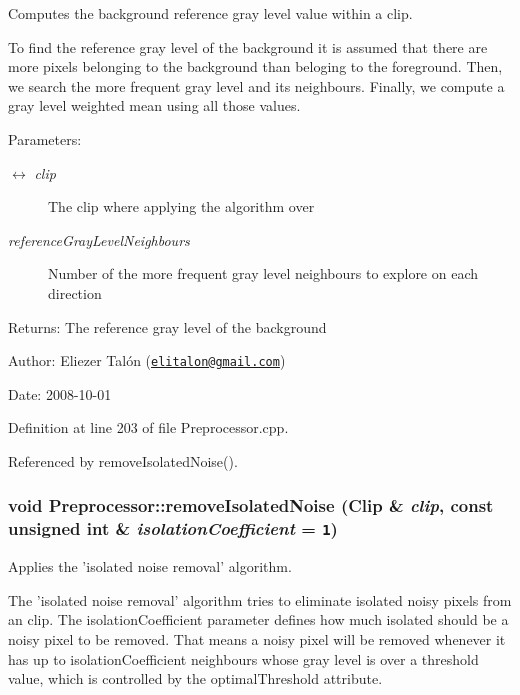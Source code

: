 Computes the background reference gray level value within a clip. 

To find the reference gray level of the background it is assumed that there are more pixels belonging to the background than beloging to the foreground. Then, we search the more frequent gray level and its neighbours. Finally, we compute a gray level weighted mean using all those values.

\begin{Desc}
\item[Parameters:]
\begin{description}
\item[\mbox{$\leftrightarrow$} {\em clip}]The clip where applying the algorithm over \item[{\em referenceGrayLevelNeighbours}]Number of the more frequent gray level neighbours to explore on each direction\end{description}
\end{Desc}
\begin{Desc}
\item[Returns:]The reference gray level of the background\end{Desc}
\begin{Desc}
\item[Author:]Eliezer Talón (\href{mailto:elitalon@gmail.com}{\tt elitalon@gmail.com}) \end{Desc}
\begin{Desc}
\item[Date:]2008-10-01 \end{Desc}


Definition at line 203 of file Preprocessor.cpp.

Referenced by removeIsolatedNoise().\hypertarget{class_preprocessor_a365f69af48cae608071e9943f300dd5}{
\subsubsection[removeIsolatedNoise]{\setlength{\rightskip}{0pt plus 5cm}void Preprocessor::removeIsolatedNoise ({\bf Clip} \& {\em clip}, \/  const unsigned int \& {\em isolationCoefficient} = {\tt 1})}}
\label{class_preprocessor_a365f69af48cae608071e9943f300dd5}


Applies the 'isolated noise removal' algorithm. 

The 'isolated noise removal' algorithm tries to eliminate isolated noisy pixels from an clip. The isolationCoefficient parameter defines how much isolated should be a noisy pixel to be removed. That means a noisy pixel will be removed whenever it has up to isolationCoefficient neighbours whose gray level is over a threshold value, which is controlled by the optimalThreshold attribute.

